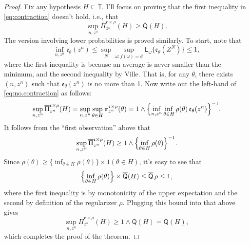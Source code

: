 \documentclass[a4paper, 12pt]{article}
\theoremstyle{plain}
\theoremstyle{definition}
\theoremstyle{remark}
\newcommand{\E}{\mathsf{E}}
\newcommand{\TT}{\mathbb{T}}
\newcommand{\uPi}{\overline{\Pi}}
\newcommand{\uprior}{\overline{\mathsf{Q}}}
\newcommand{\eval}{\mathfrak{e}}
\begin{document}
\begin{proof}
Fix any hypothesis $H \subseteq \TT$.  I'll focus on proving that the first inequality in \eqref{eq:contraction} doesn't hold, i.e., that 
\begin{equation}
\label{eq:no.contraction}
\sup_{n,z^n} \uPi_{z^n}^{\eval \times \rho}(H) \geq \uprior(H). 
\end{equation}
The version involving lower probabilities is proved similarly.  To start, note that 
\[ \inf_{n, z^n} \eval_\theta(z^n) \leq \sup_N \sup_{\omega: f(\omega)=\theta} \E_\omega \{ \eval_\theta(Z^N) \} \leq 1, \]
where the first inequality is because an average is never smaller than the minimum, and the second inequality by Ville.  That is, for any $\theta$, there exists $(n,z^n)$ such that $\eval_\theta(z^n)$ is no more than 1.  Now write out the left-hand of \eqref{eq:no.contraction} as follows:
\[ \sup_{n,z^n} \uPi_{z^n}^{\eval \times \rho}(H) = \sup_{n,z^n} \sup_{\theta \in H} \pi_{z^n}^{\eval \times \rho}(\theta) = 1 \wedge \Bigl\{ \inf_{n,z^n} \inf_{\theta \in H} \rho(\theta) \, \eval_\theta(z^n) \Bigr\}^{-1}. \]
It follows from the ``first observation'' above that 
\[ \sup_{n,z^n} \uPi_{z^n}^{\eval \times \rho}(H) \geq 1 \wedge \Bigl\{ \inf_{\theta \in H} \rho(\theta) \Bigr\}^{-1}. \]
Since $\rho(\theta) \geq \{ \inf_{\theta \in H} \rho(\theta) \} \times 1(\theta \in H)$, it's easy to see that 
\[ \Bigl\{ \inf_{\theta \in H} \rho(\theta) \Bigr\} \times \uprior(H) \leq \uprior\,\rho \leq 1, \]
where the first inequality is by monotonicity of the upper expectation and the second by definition of the regularizer $\rho$.  Plugging this bound into that above gives 
\[ \sup_{n,z^n} \uPi_{z^n}^{\eval \times \rho}(H) \geq 1 \wedge \uprior(H) = \uprior(H), \]
which completes the proof of the theorem. 
\end{proof}
\end{document}
